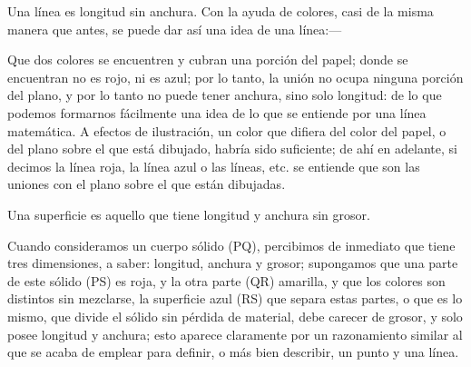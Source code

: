 \documentclass[booklanguage=english]{byrnebook}
\begin{document}
Una línea es longitud sin anchura. Con la ayuda de colores, casi de la misma manera que antes, se puede dar así una idea de una línea:—

\drawCurrentPictureInMargin
Que dos colores se encuentren y cubran una porción del papel; donde se encuentran no es rojo, ni es azul; por lo tanto, la unión no ocupa ninguna porción del plano, y por lo tanto no puede tener anchura, sino solo longitud: de lo que podemos formarnos fácilmente una idea de lo que se entiende por una línea matemática. A efectos de ilustración, un color que difiera del color del papel, o del plano sobre el que está dibujado, habría sido suficiente; de ahí en adelante, si decimos la línea roja, la línea azul o las líneas, etc. se entiende que son las uniones con el plano sobre el que están dibujadas.

\drawCurrentPictureInMargin
Una superficie es aquello que tiene longitud y anchura sin grosor.

Cuando consideramos un cuerpo sólido (PQ), percibimos de inmediato que tiene tres dimensiones, a saber: longitud, anchura y grosor; supongamos que una parte de este sólido (PS) es roja, y la otra parte (QR) amarilla, y que los colores son distintos sin mezclarse, la superficie azul (RS) que separa estas partes, o que es lo mismo, que divide el sólido sin pérdida de material, debe carecer de grosor, y solo posee longitud y anchura; esto aparece claramente por un razonamiento similar al que se acaba de emplear para definir, o más bien describir, un punto y una línea.
\end{document}
